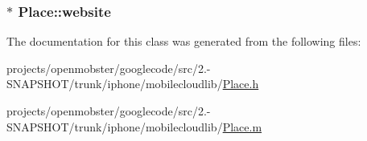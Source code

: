 \label{interface_place_aef36487d4eb51ba31be7aeafd16317ee}
\hypertarget{interface_place_ae95d94e85f00267531f3c2e9f8fcb2e6}{
\subsubsection[{website}]{ $\ast$ \-Place\-::website}}
\label{interface_place_ae95d94e85f00267531f3c2e9f8fcb2e6}


\-The documentation for this class was generated from the following files\-:\begin{DoxyCompactItemize}
\item 
projects/openmobster/googlecode/src/2.-\/\-S\-N\-A\-P\-S\-H\-O\-T/trunk/iphone/mobilecloudlib/\hyperlink{_place_8h}{\-Place.\-h}\item 
projects/openmobster/googlecode/src/2.-\/\-S\-N\-A\-P\-S\-H\-O\-T/trunk/iphone/mobilecloudlib/\hyperlink{_place_8m}{\-Place.\-m}\end{DoxyCompactItemize}
